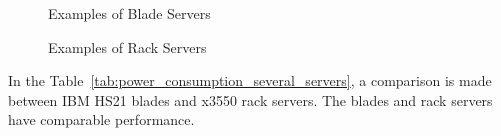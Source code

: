 {\begin{figure}[h!tb]
                \caption{Examples of Blade Servers}
                \label{fig:example_blade_server}
            \end{figure}
            \begin{figure}[h!tb]
                \centering
                \caption{Examples of Rack Servers}
                \label{fig:example_rack_server}
            \end{figure}
            In the Table~\ref{tab:power_consumption_several_servers}, a comparison is made between IBM HS21 blades and x3550 rack servers. The blades and rack servers have comparable performance.
}
